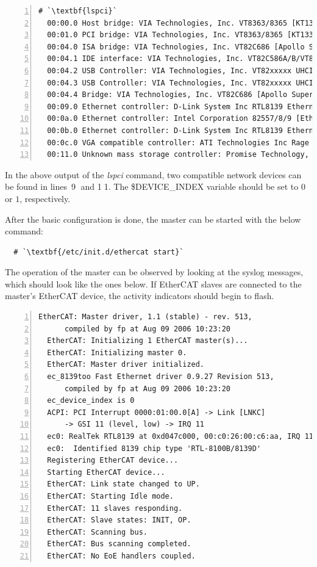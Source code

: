 \documentclass[a4paper,12pt,BCOR6mm,bibtotoc,idxtotoc]{scrbook}
\begin{document}
\begin{lstlisting}[numbers=left,basicstyle=\ttfamily\scriptsize]
  # `\textbf{lspci}`
  00:00.0 Host bridge: VIA Technologies, Inc. VT8363/8365 [KT133/KM133] (rev 03)
  00:01.0 PCI bridge: VIA Technologies, Inc. VT8363/8365 [KT133/KM133 AGP]
  00:04.0 ISA bridge: VIA Technologies, Inc. VT82C686 [Apollo Super South] (rev 40)
  00:04.1 IDE interface: VIA Technologies, Inc. VT82C586A/B/VT82C686/A/B/VT823x/A/C...
  00:04.2 USB Controller: VIA Technologies, Inc. VT82xxxxx UHCI USB 1.1 Controller...
  00:04.3 USB Controller: VIA Technologies, Inc. VT82xxxxx UHCI USB 1.1 Controller...
  00:04.4 Bridge: VIA Technologies, Inc. VT82C686 [Apollo Super ACPI] (rev 40)
  00:09.0 Ethernet controller: D-Link System Inc RTL8139 Ethernet (rev 10)
  00:0a.0 Ethernet controller: Intel Corporation 82557/8/9 [Ethernet Pro 100] (rev 08)
  00:0b.0 Ethernet controller: D-Link System Inc RTL8139 Ethernet (rev 10)
  00:0c.0 VGA compatible controller: ATI Technologies Inc Rage XL (rev 27)
  00:11.0 Unknown mass storage controller: Promise Technology, Inc. PDC20265...
\end{lstlisting}

In the above output of the \textit{lspci} command, two compatible
network devices can be found in lines~\textcircled{\tiny 9} and
\textcircled{\tiny 11}. The \$DEVICE\_INDEX variable should be set to
$0$ or $1$, respectively.

After the basic configuration is done, the master can be started with
the below command:

\begin{lstlisting}
  # `\textbf{/etc/init.d/ethercat start}`
\end{lstlisting}

The operation of the master can be observed by looking at the
syslog messages, which should look like the ones below.
If EtherCAT slaves are connected to the master's EtherCAT device, the
activity indicators should begin to flash.

\begin{lstlisting}[numbers=left]
  EtherCAT: Master driver, 1.1 (stable) - rev. 513,
      compiled by fp at Aug 09 2006 10:23:20
  EtherCAT: Initializing 1 EtherCAT master(s)...
  EtherCAT: Initializing master 0.
  EtherCAT: Master driver initialized.
  ec_8139too Fast Ethernet driver 0.9.27 Revision 513,
      compiled by fp at Aug 09 2006 10:23:20
  ec_device_index is 0
  ACPI: PCI Interrupt 0000:01:00.0[A] -> Link [LNKC]
      -> GSI 11 (level, low) -> IRQ 11
  ec0: RealTek RTL8139 at 0xd047c000, 00:c0:26:00:c6:aa, IRQ 11
  ec0:  Identified 8139 chip type 'RTL-8100B/8139D'
  Registering EtherCAT device...
  Starting EtherCAT device...
  EtherCAT: Link state changed to UP.
  EtherCAT: Starting Idle mode.
  EtherCAT: 11 slaves responding.
  EtherCAT: Slave states: INIT, OP.
  EtherCAT: Scanning bus.
  EtherCAT: Bus scanning completed.
  EtherCAT: No EoE handlers coupled.
\end{lstlisting}
\end{document}
